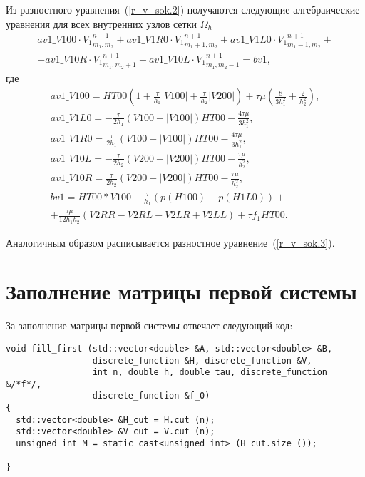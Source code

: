 \documentclass[a4paper,11pt]{article}
\begin{document}
Из разностного уравнения~(\ref{r_v_sok.2}) получаются следующие алгебраические
уравнения для всех внутренних  узлов сетки $\Omega_h$
\begin{equation}
\begin{array}{l}
av1\_V100\cdot {V_1}^{n+1}_{m_1,m_2}+av1\_V1R0\cdot {V_1}^{n+1}_{m_1+1,m_2}+
av1\_V1L0\cdot {V_1}^{n+1}_{m_1-1,m_2} +\\ +av1\_V10R\cdot {V_1}^{n+1}_{m_1,m_2+1}
+av1\_V10L\cdot {V_1}^{n+1}_{m_1,m_2-1}=bv1,
 \end{array}
\label{r_v_sok.4}
\end{equation}
где
\begin{equation}
\begin{array}{l}
av1\_V100=HT00(1+
\frac{\tau}{h_1}|V100|+\frac{\tau}{h_2}|V200|)+
\tau\mu\left(\frac{8}{3h_1^2}+\frac{2}{h_2^2}\right),\\
av1\_V1L0=
-\frac{\tau}{2h_1}(V100+|V100|)HT00-
\frac{4\tau\mu}{3h_1^2},\\
av1\_V1R0=
\frac{\tau}{2h_1}(V100-|V100|)HT00-
\frac{4\tau\mu}{3h_1^2},\\
av1\_V10L=-\frac{\tau}{2h_2}(V200+|V200|)HT00-
\frac{\tau\mu}{h_2^2},\\
av1\_V10R=\frac{\tau}{2h_2}(V200-|V200|)HT00-
\frac{\tau\mu}{h_2^2},\\
bv1=HT00*V100-\frac{\tau}{h_1}(p(H100)-
p(H1L0))+\\
+\frac{\tau\mu}{12h_1h_2}(V2RR-V2RL-V2LR+V2LL)+\tau f_1 HT00.
 \end{array}
\label{r_v_sok.5}
\end{equation}

Аналогичным образом расписывается разностное уравнение~(\ref{r_v_sok.3}).















\newpage
\section{Заполнение матрицы первой системы}
За заполнение матрицы первой системы отвечает следующий код:
\begin{verbatim}
void fill_first (std::vector<double> &A, std::vector<double> &B,
                 discrete_function &H, discrete_function &V,
                 int n, double h, double tau, discrete_function &/*f*/,
                 discrete_function &f_0)
{
  std::vector<double> &H_cut = H.cut (n);
  std::vector<double> &V_cut = V.cut (n);
  unsigned int M = static_cast<unsigned int> (H_cut.size ());

}
\end{verbatim}
\end{document}
